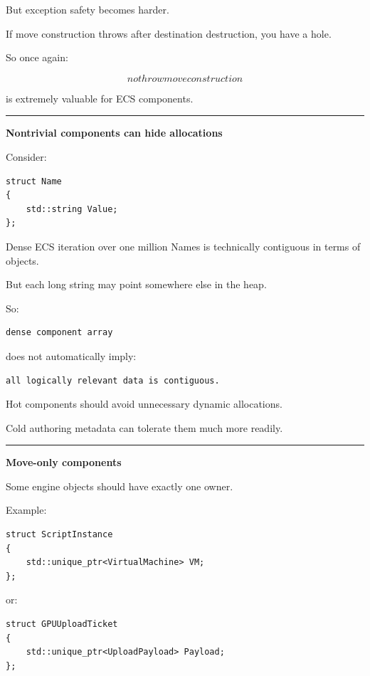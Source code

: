But exception safety becomes harder.

If move construction throws after destination destruction, you have a hole.

So once again:

\[
\boxed{
nothrow move construction
}
\]

is extremely valuable for ECS components.

\begin{center}\rule{0.5\linewidth}{0.5pt}\end{center}

\textbf{Nontrivial components can hide allocations}

Consider:

\begin{verbatim}
struct Name
{
    std::string Value;
};
\end{verbatim}

Dense ECS iteration over one million Names is technically contiguous in terms of  objects.

But each long string may point somewhere else in the heap.

So:

\begin{verbatim}
dense component array
\end{verbatim}

does not automatically imply:

\begin{verbatim}
all logically relevant data is contiguous.
\end{verbatim}

Hot components should avoid unnecessary dynamic allocations.

Cold authoring metadata can tolerate them much more readily.

\begin{center}\rule{0.5\linewidth}{0.5pt}\end{center}

\textbf{Move-only components}

Some engine objects should have exactly one owner.

Example:

\begin{verbatim}
struct ScriptInstance
{
    std::unique_ptr<VirtualMachine> VM;
};
\end{verbatim}

or:

\begin{verbatim}
struct GPUUploadTicket
{
    std::unique_ptr<UploadPayload> Payload;
};
\end{verbatim}


